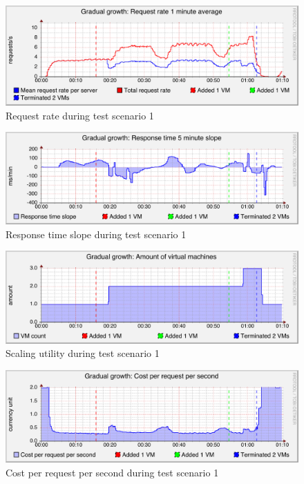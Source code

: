 \documentclass[english]{tktltiki2}
\theoremstyle{definition}
\theoremstyle{remark}
\begin{document}
\begin{figure}[htbp]
	\includegraphics[width=\textwidth]{images/requestrategraph-test21}
	\caption{Request rate during test scenario 1}
	\label{fig:requestRateScenario1}
\end{figure}

\begin{figure}[htbp]
	\includegraphics[width=\textwidth]{images/responsetimeslopegraph-test21}
	\caption{Response time slope during test scenario 1}
	\label{fig:responseTimeSlopeScenario1}
\end{figure}

\begin{figure}[htbp]
	\includegraphics[width=\textwidth]{images/vmcountgraph-test21}
	\caption{Scaling utility during test scenario 1}
	\label{fig:vmCountScenario1}
\end{figure}

\begin{figure}[htbp]
	\includegraphics[width=\textwidth]{images/costperrequestpersecondgraph-test21}
	\caption{Cost per request per second during test scenario 1}
	\label{fig:costScenario1}
\end{figure}
\end{document}
